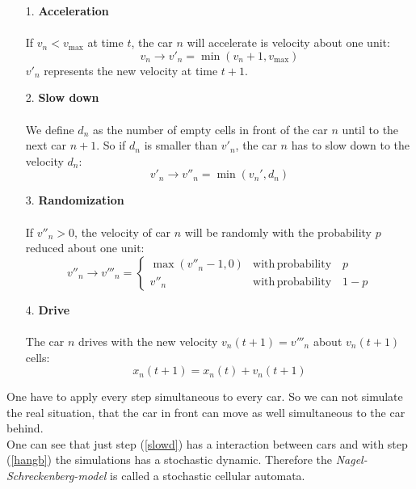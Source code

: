 \documentclass[11pt]{article}
\begin{document}
\begin{itemize}
\item[1.]	\textbf{Acceleration}\\
\\
If $v_n<v_{\mathrm{max}}$ at time $t$, the car $n$ will accelerate is velocity about one unit:
\begin{equation}
v_n \rightarrow v'_n = \min(v_n+1,v_\mathrm{max})
\label{accel}
\end{equation}
$v'_n$ represents the new velocity at time $t+1$.
\item[2.]  \textbf{Slow down}\\
\\
We define $d_n$ as the number of empty cells in front of the car $n$ until to the next car $n+1$. So if $d_n$ is smaller than $v'_n$, the car $n$ has to slow down to the velocity $d_n$:
\begin{equation}
v'_n \rightarrow v''_n = \min(v_n',d_n)
\label{slowd}
\end{equation}
\item[3.]  \textbf{Randomization}\\
\\
If $v''_n>0$, the velocity of car $n$ will be randomly with the probability $p$ reduced about one unit:
\begin{equation}
v''_n \rightarrow v'''_n=
\begin{cases}
\max(v''_n-1,0) & \mathrm{with\,probability} \quad p\\
v''_n & \mathrm{with\,probability} \quad 1-p
\end{cases}
\label{hangb}
\end{equation}
\item[4.] \textbf{Drive}\\
\\
The car $n$ drives with the new velocity $v_n(t+1)=v'''_n$ about $v_n(t+1)$ cells:
\begin{equation}
x_n(t+1)=x_n(t)+v_n(t+1)
\label{drive}
\end{equation}
\end{itemize}
One have to apply every step simultaneous to every car. So we can not simulate the real situation, that the car in front can move as well simultaneous to the car behind.
\\
One can see that just step (\ref{slowd}) has a interaction between cars and with step (\ref{hangb}) the simulations has a stochastic  dynamic. Therefore the \textit{Nagel-Schreckenberg-model} is called a stochastic cellular automata.\\
\end{document}
